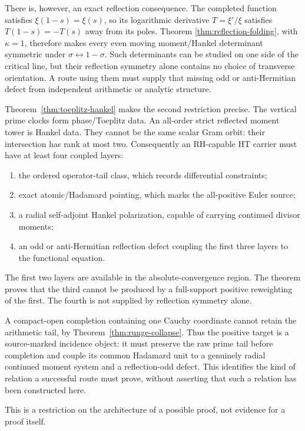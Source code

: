 \documentclass[11pt]{article}
\theoremstyle{definition}
\theoremstyle{remark}
\begin{document}
There is, however, an exact reflection consequence.  The completed function satisfies
\(\xi(1-s)=\xi(s)\), so its logarithmic derivative
\(T=\xi'/\xi\) satisfies \(T(1-s)=-T(s)\) away from its poles.  Theorem
\ref{thm:reflection-folding}, with \(\kappa=1\), therefore makes every even moving
moment/Hankel determinant symmetric under \(\sigma\leftrightarrow1-\sigma\).  Such determinants
can be studied on one side of the critical line, but their reflection symmetry alone contains no
choice of transverse orientation.  A route using them must supply that missing odd or
anti-Hermitian defect from independent arithmetic or analytic structure.

Theorem~\ref{thm:toeplitz-hankel} makes the second restriction precise.  The vertical prime
clocks form phase/Toeplitz data.  An all-order strict reflected moment tower is Hankel data.  They
cannot be the same scalar Gram orbit: their intersection has rank at most two.  Consequently an
RH-capable HT carrier must have at least four coupled layers:
\begin{enumerate}[label=(\arabic*),leftmargin=2.2em]
  \item the ordered operator-tail class, which records differential constraints;
  \item exact atomic/Hadamard pointing, which marks the all-positive Euler source;
  \item a radial self-adjoint Hankel polarization, capable of carrying continued divisor
  moments;
  \item an odd or anti-Hermitian reflection defect coupling the first three layers to the
  functional equation.
\end{enumerate}
The first two layers are available in the absolute-convergence region.  The theorem proves that
the third cannot be produced by a full-support positive reweighting of the first.  The fourth is
not supplied by reflection symmetry alone.

A compact-open completion containing one Cauchy coordinate cannot retain the arithmetic tail,
by Theorem~\ref{thm:runge-collapse}.  Thus the positive target is a source-marked incidence
object: it must preserve the raw prime tail before completion and couple its common Hadamard unit
to a genuinely radial continued moment system and a reflection-odd defect.  This identifies the
kind of relation a successful route must prove, without asserting that such a relation has been
constructed here.

This is a restriction on the architecture of a possible proof, not evidence for a proof itself.
\end{document}

